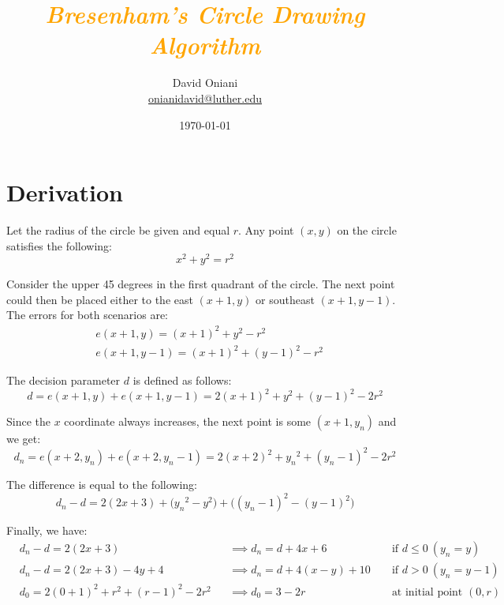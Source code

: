 \documentclass{article}
\author{David Oniani\\
        \href{mailto:onianidavid@luther.edu}{onianidavid@luther.edu}}
\title{\textcolor{orange}{\textit{Bresenham's Circle Drawing Algorithm}}}
\date{\today}
\begin{document}
\maketitle


\section{Derivation}

Let the radius of the circle be given and equal \(r\). Any point \((x, y)\) on the circle satisfies
the following:
\begin{equation}
    x^2 + y^2 = r^2
\end{equation}

Consider the upper 45 degrees in the first quadrant of the circle. The next point could then be
placed either to the east \((x + 1, y)\) or southeast \((x + 1, y - 1)\). The errors for both
scenarios are:
\begin{align}
    &e(x + 1, y) = {(x + 1)}^2 + y^2 - r^2\\
    &e(x + 1, y - 1) = {(x + 1)}^2 + {(y - 1)}^2 - r^2
\end{align}

The decision parameter \(d\) is defined as follows:
\begin{equation}
    d = e(x + 1, y) + e(x + 1, y - 1)
      = 2{(x + 1)}^2 + y^2 + {(y - 1)}^2 - 2r^2
\end{equation}

Since the \(x\) coordinate always increases, the next point is some \((x + 1, y_n)\) and we get:
\begin{equation}
    d_n = e(x + 2, y_n) + e(x + 2, y_n - 1)
        = 2{(x + 2)}^2 + {y_n}^2 + {(y_n - 1)}^2 - 2r^2
\end{equation}

The difference is equal to the following:
\begin{equation}
    d_n - d = 2(2x + 3) + \big({y_n}^2 - y^2\big) + \big({(y_n - 1)}^2 - {(y - 1)}^2\big)
\end{equation}

Finally, we have:
\begin{align}
    &d_n - d = 2(2x + 3) &&\implies d_n
             = d + 4x + 6 &&\text{ if } d \leq 0\ (y_n = y)\\
    &d_n - d = 2(2x + 3) - 4y + 4 &&\implies d_n
             = d + 4(x - y) + 10 &&\text{ if } d > 0\ (y_n = y - 1)\\
    &d_0 = 2{(0 + 1)}^2 + r^2 + {(r - 1)}^2 - 2r^2 &&\implies d_0
         = 3 - 2r &&\text{ at initial point } (0, r)
\end{align}
\end{document}
